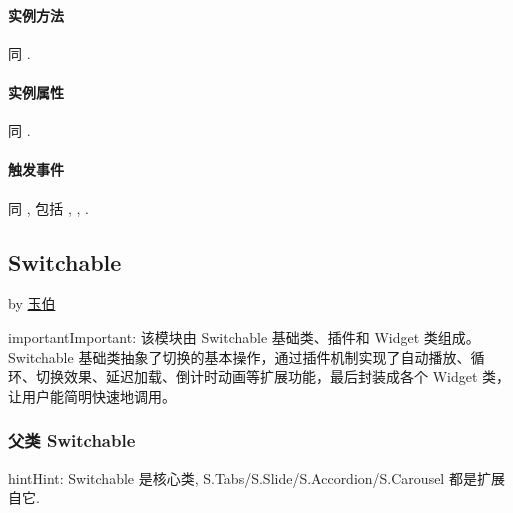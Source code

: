 \documentclass[letterpaper,10pt,english]{sphinxmanual}
\begin{document}
\paragraph{实例方法}
\label{api/component/overlay/popup:id3}
同 {\hyperref[api/component/overlay/overlay:Overlay.Overlay]{}}.


\paragraph{实例属性}
\label{api/component/overlay/popup:id4}
同 {\hyperref[api/component/overlay/overlay:Overlay.Overlay]{}}.


\paragraph{触发事件}
\label{api/component/overlay/popup:id5}
同 {\hyperref[api/component/overlay/overlay:Overlay.Overlay]{}}, 包括 {\hyperref[api/component/overlay/overlay:Overlay.show]{}} , {\hyperref[api/component/overlay/overlay:Overlay.hide]{}} , {\hyperref[api/component/overlay/overlay:Overlay.beforeVisibleChange]{}} .
\label{api/component/switchable/index:module-Switchable}

\subsection{Switchable}
\label{api/component/switchable/index::doc}\label{api/component/switchable/index:switchable}
by \href{mailto:lifesinger@gmail.com}{玉伯}

\begin{notice}{important}{Important:}
该模块由 Switchable 基础类、插件和 Widget 类组成。Switchable 基础类抽象了切换的基本操作，通过插件机制实现了自动播放、循环、切换效果、延迟加载、倒计时动画等扩展功能，最后封装成各个 Widget 类，让用户能简明快速地调用。
\end{notice}


\subsubsection{父类 Switchable}
\label{api/component/switchable/switchable::doc}\label{api/component/switchable/switchable:switchable}
\begin{notice}{hint}{Hint:}
Switchable 是核心类, S.Tabs/S.Slide/S.Accordion/S.Carousel 都是扩展自它.
\end{notice}
\end{document}
